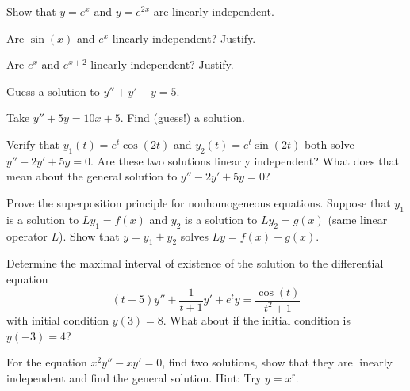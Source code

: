 \begin{exercise}
Show that $y=e^x$ and $y=e^{2x}$ are linearly independent.
\end{exercise}

\begin{exercise}\ansMark%
Are $\sin(x)$ and $e^x$ linearly independent?  Justify.
\end{exercise}


\begin{exercise}\ansMark%
Are $e^x$ and $e^{x+2}$ linearly independent?  Justify.
\end{exercise}

\begin{exercise}\ansMark%
Guess a solution to $y'' + y' + y= 5$.
\end{exercise}

\begin{exercise}
Take $y'' + 5 y = 10 x + 5$.  Find (guess!) a solution.
\end{exercise}

\begin{exercise}
Verify that $y_1(t) = e^t \cos(2t)$ and $y_2(t) = e^t \sin(2t)$ both solve $y'' - 2y' + 5y = 0$. Are these two solutions linearly independent? What does that mean about the general solution to $y'' - 2y' + 5y = 0$?
\end{exercise}

\begin{exercise}
Prove the superposition principle for nonhomogeneous equations.  Suppose that
$y_1$ is a solution to $L y_1 = f(x)$ and $y_2$ is a solution to
$L y_2 = g(x)$ (same linear operator $L$).  Show that $y = y_1+y_2$ solves
$Ly = f(x) + g(x)$.
\end{exercise}

\begin{exercise}
Determine the maximal interval of existence of the solution to the differential equation
\[ (t - 5)y'' + \frac{1}{t+1}y' + e^t y = \frac{\cos(t)}{t^2 + 1} \] with initial condition $y(3) = 8$. What about if the initial condition is $y(-3) = 4$?
\end{exercise}

\begin{exercise}
For the equation $x^2 y'' - x y' = 0$, find two solutions, show that they
are linearly independent and find the general solution.
Hint: Try $y = x^r$.
\end{exercise}


